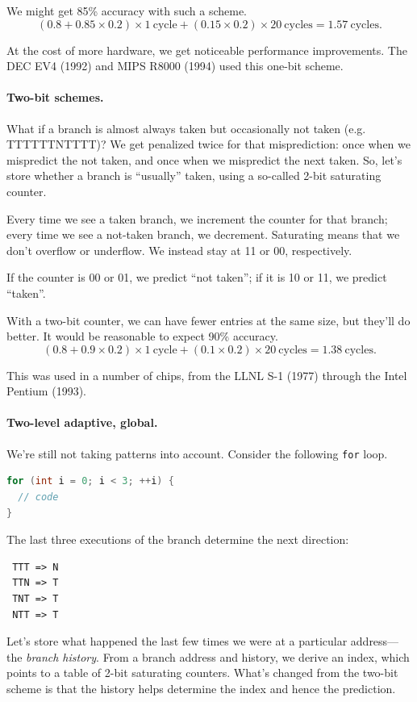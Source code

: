 \documentclass[a4paper]{report}
\begin{document}
We might get 85\% accuracy with such a scheme.
\[
(0.8 + 0.85 \times 0.2) \times 1 \mathrm{~cycle} + (0.15 \times 0.2) \times 20 \mathrm{~cycles} = 1.57 \mathrm{~cycles}.
\]

At the cost of more hardware, we get noticeable performance improvements. The DEC EV4 (1992) and
MIPS R8000 (1994) used this one-bit scheme.

\paragraph{Two-bit schemes.}
What if a branch is almost always taken but occasionally not taken (e.g. TTTTTTNTTTT)?
We get penalized twice
for that misprediction: once when we mispredict the not taken, and once when we mispredict the
next taken. So, let's store whether a branch is ``usually'' taken, using a so-called
2-bit saturating counter.

Every time we see a taken branch, we increment the counter for that
branch; every time we see a not-taken branch, we decrement. Saturating
means that we don't overflow or underflow. We instead stay at 11 or
00, respectively.

If the counter is 00 or 01, we predict ``not taken''; if it is 10 or
11, we predict ``taken''.

With a two-bit counter, we can have fewer entries at the same size, but they'll do better.
It would be reasonable to expect 90\% accuracy.
\[
(0.8 + 0.9 \times 0.2) \times 1 \mathrm{~cycle} + (0.1 \times 0.2) \times 20 \mathrm{~cycles} = 1.38 \mathrm{~cycles}.
\]

This was used in a number of chips, from the LLNL S-1 (1977) through the Intel Pentium (1993).

\paragraph{Two-level adaptive, global.}
We're still not taking patterns into account. Consider the following {\tt for} loop.
\begin{lstlisting}[language=C]
for (int i = 0; i < 3; ++i) {
  // code
}
\end{lstlisting}
The last three executions of the branch determine the next direction:
\begin{verbatim}
 TTT => N
 TTN => T
 TNT => T
 NTT => T
\end{verbatim}
Let's store what happened the last few times we were at a particular address---the
\emph{branch history}. From a branch address and history, we derive an index, which
points to a table of 2-bit saturating counters. What's changed from the two-bit scheme
is that the history helps determine the index and hence the prediction.
\end{document}
